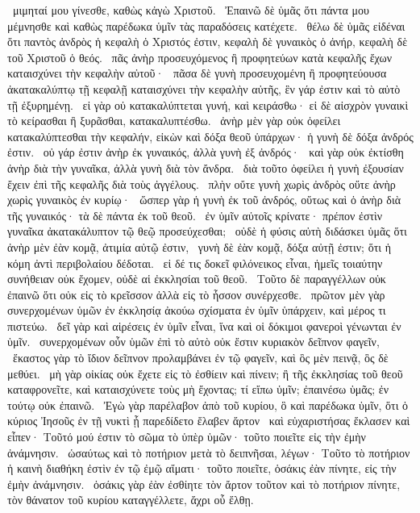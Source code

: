~μιμηταί μου γίνεσθε, καθὼς κἀγὼ Χριστοῦ.
~Ἐπαινῶ δὲ ὑμᾶς ὅτι πάντα μου μέμνησθε καὶ καθὼς παρέδωκα ὑμῖν τὰς παραδόσεις κατέχετε.
~θέλω δὲ ὑμᾶς εἰδέναι ὅτι παντὸς ἀνδρὸς ἡ κεφαλὴ ὁ Χριστός ἐστιν, κεφαλὴ δὲ γυναικὸς ὁ ἀνήρ, κεφαλὴ δὲ τοῦ Χριστοῦ ὁ θεός.
~πᾶς ἀνὴρ προσευχόμενος ἢ προφητεύων κατὰ κεφαλῆς ἔχων καταισχύνει τὴν κεφαλὴν αὐτοῦ·
~πᾶσα δὲ γυνὴ προσευχομένη ἢ προφητεύουσα ἀκατακαλύπτῳ τῇ κεφαλῇ καταισχύνει τὴν κεφαλὴν αὐτῆς, ἓν γάρ ἐστιν καὶ τὸ αὐτὸ τῇ ἐξυρημένῃ.
~εἰ γὰρ οὐ κατακαλύπτεται γυνή, καὶ κειράσθω· εἰ δὲ αἰσχρὸν γυναικὶ τὸ κείρασθαι ἢ ξυρᾶσθαι, κατακαλυπτέσθω.
~ἀνὴρ μὲν γὰρ οὐκ ὀφείλει κατακαλύπτεσθαι τὴν κεφαλήν, εἰκὼν καὶ δόξα θεοῦ ὑπάρχων· ἡ γυνὴ δὲ δόξα ἀνδρός ἐστιν.
~οὐ γάρ ἐστιν ἀνὴρ ἐκ γυναικός, ἀλλὰ γυνὴ ἐξ ἀνδρός·
~καὶ γὰρ οὐκ ἐκτίσθη ἀνὴρ διὰ τὴν γυναῖκα, ἀλλὰ γυνὴ διὰ τὸν ἄνδρα.
~διὰ τοῦτο ὀφείλει ἡ γυνὴ ἐξουσίαν ἔχειν ἐπὶ τῆς κεφαλῆς διὰ τοὺς ἀγγέλους.
~πλὴν οὔτε γυνὴ χωρὶς ἀνδρὸς οὔτε ἀνὴρ χωρὶς γυναικὸς ἐν κυρίῳ·
~ὥσπερ γὰρ ἡ γυνὴ ἐκ τοῦ ἀνδρός, οὕτως καὶ ὁ ἀνὴρ διὰ τῆς γυναικός· τὰ δὲ πάντα ἐκ τοῦ θεοῦ.
~ἐν ὑμῖν αὐτοῖς κρίνατε· πρέπον ἐστὶν γυναῖκα ἀκατακάλυπτον τῷ θεῷ προσεύχεσθαι;
~οὐδὲ ἡ φύσις αὐτὴ διδάσκει ὑμᾶς ὅτι ἀνὴρ μὲν ἐὰν κομᾷ, ἀτιμία αὐτῷ ἐστιν,
~γυνὴ δὲ ἐὰν κομᾷ, δόξα αὐτῇ ἐστιν; ὅτι ἡ κόμη ἀντὶ περιβολαίου δέδοται.
~εἰ δέ τις δοκεῖ φιλόνεικος εἶναι, ἡμεῖς τοιαύτην συνήθειαν οὐκ ἔχομεν, οὐδὲ αἱ ἐκκλησίαι τοῦ θεοῦ.
~Τοῦτο δὲ παραγγέλλων οὐκ ἐπαινῶ ὅτι οὐκ εἰς τὸ κρεῖσσον ἀλλὰ εἰς τὸ ἧσσον συνέρχεσθε.
~πρῶτον μὲν γὰρ συνερχομένων ὑμῶν ἐν ἐκκλησίᾳ ἀκούω σχίσματα ἐν ὑμῖν ὑπάρχειν, καὶ μέρος τι πιστεύω.
~δεῖ γὰρ καὶ αἱρέσεις ἐν ὑμῖν εἶναι, ἵνα καὶ οἱ δόκιμοι φανεροὶ γένωνται ἐν ὑμῖν.
~συνερχομένων οὖν ὑμῶν ἐπὶ τὸ αὐτὸ οὐκ ἔστιν κυριακὸν δεῖπνον φαγεῖν,
~ἕκαστος γὰρ τὸ ἴδιον δεῖπνον προλαμβάνει ἐν τῷ φαγεῖν, καὶ ὃς μὲν πεινᾷ, ὃς δὲ μεθύει.
~μὴ γὰρ οἰκίας οὐκ ἔχετε εἰς τὸ ἐσθίειν καὶ πίνειν; ἢ τῆς ἐκκλησίας τοῦ θεοῦ καταφρονεῖτε, καὶ καταισχύνετε τοὺς μὴ ἔχοντας; τί εἴπω ὑμῖν; ἐπαινέσω ὑμᾶς; ἐν τούτῳ οὐκ ἐπαινῶ.
~Ἐγὼ γὰρ παρέλαβον ἀπὸ τοῦ κυρίου, ὃ καὶ παρέδωκα ὑμῖν, ὅτι ὁ κύριος Ἰησοῦς ἐν τῇ νυκτὶ ᾗ παρεδίδετο ἔλαβεν ἄρτον
~καὶ εὐχαριστήσας ἔκλασεν καὶ εἶπεν· Τοῦτό μού ἐστιν τὸ σῶμα τὸ ὑπὲρ ὑμῶν· τοῦτο ποιεῖτε εἰς τὴν ἐμὴν ἀνάμνησιν.
~ὡσαύτως καὶ τὸ ποτήριον μετὰ τὸ δειπνῆσαι, λέγων· Τοῦτο τὸ ποτήριον ἡ καινὴ διαθήκη ἐστὶν ἐν τῷ ἐμῷ αἵματι· τοῦτο ποιεῖτε, ὁσάκις ἐὰν πίνητε, εἰς τὴν ἐμὴν ἀνάμνησιν.
~ὁσάκις γὰρ ἐὰν ἐσθίητε τὸν ἄρτον τοῦτον καὶ τὸ ποτήριον πίνητε, τὸν θάνατον τοῦ κυρίου καταγγέλλετε, ἄχρι οὗ ἔλθῃ.
